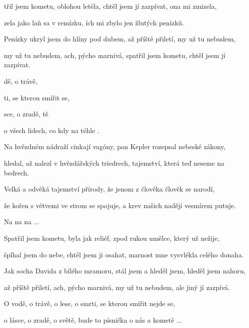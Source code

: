 

\zs
{}třil jsem kometu, oblohou letěla,
chtěl jsem jí zazpívat, ona mi zmizela,

zela jako laň sa v remízku,
ích mi zbylo jen  žlutých penízků.
\ks

\zs
Penízky ukryl jsem do hlíny pod dubem,
až příště přiletí, my už tu nebudem,

my už tu nebudem, ach, pýcho marnivá,
spatřil jsem kometu, chtěl jsem jí zazpívat.
\ks

\zr
{}dě, o trávě, 

ti, se kterou smířit  se,

sce, o zradě, tě

 o všech lidech, co kdy  na téhle .
\kr

\zs
Na hvězdném nádraží cinkají vagóny,
pan Kepler rozepsal nebeské zákony,

hledal, až nalezl v hvězdářských triedrech,
tajemství, která teď neseme na bedrech.
\ks

\zs
Velká a odvěká tajemství přírody,
že jenom z člověka člověk se narodí,

že kořen s větvemi ve strom se spojuje,
a krev našich nadějí vesmírem putuje.
\ks

\zr
Na na na ...
\kr

\zs
Spatřil jsem kometu, byla jak reliéf,
zpod rukou umělce, který už nežije,

šplhal jsem do nebe, chtěl jsem ji osahat,
marnost mne vysvlékla celého donaha.
\ks

\zs
Jak socha Davida z bílého mramoru,
stál jsem a hleděl jsem, hleděl jsem nahoru,

až příště přiletí, ach, pýcho marnivá,
my už tu nebudem, ale jiný jí zazpívá.
\ks

\zr
O vodě, o trávě, o lese,
o smrti, se kterou smířit nejde se,

o lásce, o zradě, o světě,
bude to písnička o nás a kometě ...
\kr

\kp





